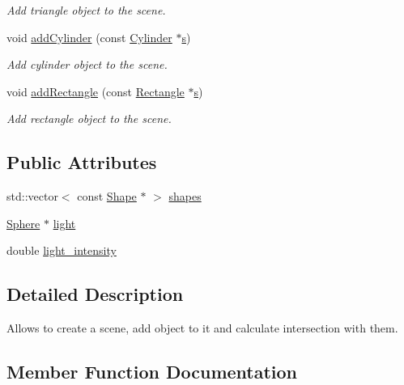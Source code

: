\begin{DoxyCompactItemize}
\begin{DoxyCompactList}\small\item\em Add triangle object to the scene. \end{DoxyCompactList}\item 
void \hyperlink{classScene_ab0c2696e58d79a68f76073dd6f7fb9b7}{add\+Cylinder} (const \hyperlink{classCylinder}{Cylinder} $\ast$\hyperlink{Main_8cpp_aecc1396fc611f6e71d5d70228e7b089a}{s})
\begin{DoxyCompactList}\small\item\em Add cylinder object to the scene. \end{DoxyCompactList}\item 
void \hyperlink{classScene_a926114a1fed32caabbc716c213e70637}{add\+Rectangle} (const \hyperlink{classRectangle}{Rectangle} $\ast$\hyperlink{Main_8cpp_aecc1396fc611f6e71d5d70228e7b089a}{s})
\begin{DoxyCompactList}\small\item\em Add rectangle object to the scene. \end{DoxyCompactList}\end{DoxyCompactItemize}
\subsection*{Public Attributes}
\begin{DoxyCompactItemize}
\item 
std\+::vector$<$ const \hyperlink{classShape}{Shape} $\ast$ $>$ \hyperlink{classScene_aff4c301d0f6f9fccbbc60859e6f40749}{shapes}
\item 
\hyperlink{classSphere}{Sphere} $\ast$ \hyperlink{classScene_a3bcb1d5f1d3f81df9d5f4a69933fa353}{light}
\item 
double \hyperlink{classScene_a4ddb7fa3ea0fab202f34b48450f5bf2b}{light\+\_\+intensity}
\end{DoxyCompactItemize}


\subsection{Detailed Description}
Allows to create a scene, add object to it and calculate intersection with them. 

\subsection{Member Function Documentation}
\mbox{\label{classScene_ab0c2696e58d79a68f76073dd6f7fb9b7}} 
